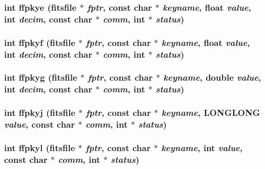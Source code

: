 \subsubsection{\setlength{\rightskip}{0pt plus 5cm}int ffpkye (\bf{fitsfile} $\ast$ {\em fptr}, const char $\ast$ {\em keyname}, float {\em value}, int {\em decim}, const char $\ast$ {\em comm}, int $\ast$ {\em status})}\label{test_2roimasker_2fitsio_8h_f213a848d9e60bacc5e630460e6d6351}


\subsubsection{\setlength{\rightskip}{0pt plus 5cm}int ffpkyf (\bf{fitsfile} $\ast$ {\em fptr}, const char $\ast$ {\em keyname}, float {\em value}, int {\em decim}, const char $\ast$ {\em comm}, int $\ast$ {\em status})}\label{test_2roimasker_2fitsio_8h_a67275524042e4941d1810f028d25997}


\subsubsection{\setlength{\rightskip}{0pt plus 5cm}int ffpkyg (\bf{fitsfile} $\ast$ {\em fptr}, const char $\ast$ {\em keyname}, double {\em value}, int {\em decim}, const char $\ast$ {\em comm}, int $\ast$ {\em status})}\label{test_2roimasker_2fitsio_8h_2538957e7c13467598770082a8fbf249}


\subsubsection{\setlength{\rightskip}{0pt plus 5cm}int ffpkyj (\bf{fitsfile} $\ast$ {\em fptr}, const char $\ast$ {\em keyname}, \bf{LONGLONG} {\em value}, const char $\ast$ {\em comm}, int $\ast$ {\em status})}\label{test_2roimasker_2fitsio_8h_5889d9051a64cb2a6aefcec388abfbd8}


\subsubsection{\setlength{\rightskip}{0pt plus 5cm}int ffpkyl (\bf{fitsfile} $\ast$ {\em fptr}, const char $\ast$ {\em keyname}, int {\em value}, const char $\ast$ {\em comm}, int $\ast$ {\em status})}\label{test_2roimasker_2fitsio_8h_e670649a23f7590da9a138dc0ae7c22a}


